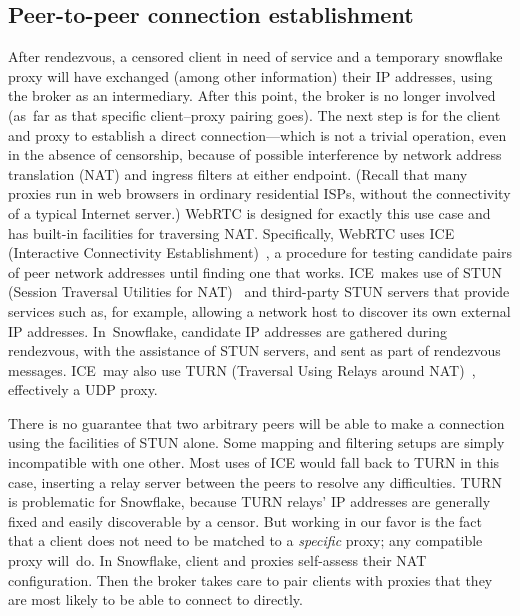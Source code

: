 \documentclass[letterpaper,twocolumn]{article}
\begin{document}
\subsection{Peer-to-peer connection establishment}
\label{sec:ice}

After rendezvous,
a censored client in need of service
and a temporary snowflake proxy
will have exchanged
(among other information)
their IP addresses,
using the broker as an intermediary.
After this point, the broker is no longer involved
(as~far as that specific client--proxy pairing goes).
The next step is for the client and proxy
to establish a direct connection---which
is not a trivial operation,
even in the absence of censorship,
because of possible interference by
network address translation (NAT)
and ingress filters at either endpoint.
(Recall that many proxies run in web browsers
in ordinary residential ISPs,
without the connectivity of a typical Internet server.)
WebRTC is designed for exactly this use case
and has built-in facilities for traversing NAT.
Specifically, WebRTC uses
ICE (Interactive Connectivity Establishment)~\cite{rfc8445},
a procedure for testing candidate pairs of peer network addresses
until finding one that works.
ICE~makes use of
STUN (Session Traversal Utilities for NAT)~\cite{rfc8489}
and third-party STUN servers that provide services such as,
for example, allowing a network host to
discover its own external IP addresses.
In~Snowflake, candidate IP addresses are gathered
during rendezvous, with the assistance of STUN servers,
and sent as part of rendezvous messages.
ICE~may also use
TURN (Traversal Using Relays around NAT)~\cite{rfc8656},
effectively a UDP proxy.

There is no guarantee that two arbitrary peers will be able to make
a connection using the facilities of STUN alone.
Some mapping and
filtering setups are simply incompatible with one other.
Most uses of ICE would fall back to TURN in this case,
inserting a relay server between the peers to resolve any difficulties.
TURN is problematic for Snowflake,
because TURN relays' IP addresses are
generally fixed and easily discoverable by a censor.
But working in our favor is the fact that
a client does not need to be matched to a \emph{specific} proxy;
any compatible proxy will~do.
In Snowflake, client and proxies self-assess their NAT configuration.
Then the broker takes care to pair clients
with proxies that they are most likely to be able to connect to directly.
\end{document}
